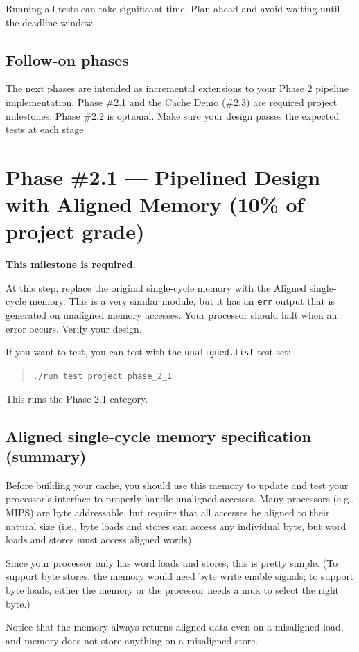 \documentclass[12pt]{article}
\begin{document}
Running all tests can take significant time. Plan ahead and avoid waiting until the deadline window.

\subsection*{Follow-on phases}
The next phases are intended as incremental extensions to your Phase 2 pipeline implementation.
Phase \#2.1 and the Cache Demo (\#2.3) are required project milestones.
Phase \#2.2 is optional.
Make sure your design passes the expected tests at each stage.

\section*{Phase \#2.1 --- Pipelined Design with Aligned Memory (10\% of project grade)}
\textbf{This milestone is required.}

At this step, replace the original single-cycle memory with the Aligned single-cycle memory.
This is a very similar module, but it has an \texttt{err} output that is generated on unaligned memory accesses.
Your processor should halt when an error occurs.
Verify your design.

If you want to test, you can test with the \texttt{unaligned.list} test set:

\begin{quote}
\texttt{./run test project phase\_2\_1}
\end{quote}
This runs the Phase 2.1 category.

\subsection*{Aligned single-cycle memory specification (summary)}
Before building your cache, you should use this memory to update and test your processor's interface to properly handle unaligned accesses.
Many processors (e.g., MIPS) are byte addressable, but require that all accesses be aligned to their natural size (i.e., byte loads and stores can access any individual byte, but word loads and stores must access aligned words).

Since your processor only has word loads and stores, this is pretty simple.
(To support byte stores, the memory would need byte write enable signals; to support byte loads, either the memory or the processor needs a mux to select the right byte.)

Notice that the memory always returns aligned data even on a misaligned load, and memory does not store anything on a misaligned store.
\end{document}
